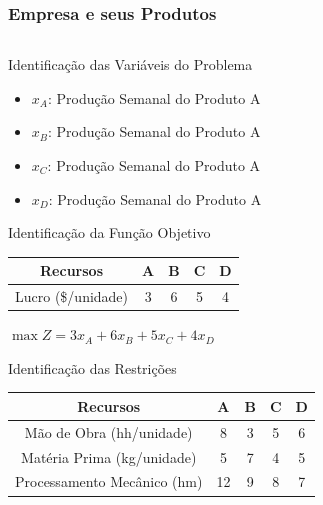 \documentclass{beamer}
\begin{document}
\begin{frame}
	\frametitle{Empresa e seus Produtos}
	\begin{columns}
		\begin{column}{0.7\textwidth}
			\only<1-2>
			{
				\begin{block}{Identificação das Variáveis do Problema}
					\centering
					\only<2>
					{
						\begin{itemize}
							\item[] $x_A$: Produção Semanal do Produto A 
							\item[] $x_B$: Produção Semanal do Produto A
							\item[] $x_C$: Produção Semanal do Produto A
							\item[] $x_D$: Produção Semanal do Produto A
						\end{itemize}
					}
				\end{block}
			}
			{
				\begin{block}{Identificação da Função Objetivo}
					\centering
					\only<4-5>
					{
						\begin{table}
							\begin{tabular}{| c | c | c | c | c |}
								\hline
								\textbf{Recursos}  & \textbf{A} & \textbf{B} & \textbf{C} & \textbf{D} \\
								\hline
								Lucro (\$/unidade) & 3 & 6 & 5 & 4 \\
								\hline  
							\end{tabular}
						\end{table}
					}
					{
						$\max Z = 3x_A + 6x_B + 5x_C + 4x_D$
					}
				\end{block}
			}
			{
				\begin{block}{Identificação das Restrições}
					\centering
					\only<7-8>
					{
						\begin{table}
							\scriptsize
							\begin{tabular}{| c | c | c | c | c |}
								\hline
								\textbf{Recursos}  			& \textbf{A} & \textbf{B} & \textbf{C} & \textbf{D} \\
								\hline
								Mão de Obra (hh/unidade)	& 8		     & 3		  & 5		   &6		    \\
								Matéria Prima (kg/unidade)	& 5			 & 7 		  & 4		   &5			\\
								Processamento Mecânico (hm) & 12		 & 9		  & 8  		   &7			\\
								\hline  
							\end{tabular}

\end{table}}
\end{block}}
\end{column}
\end{columns}
\end{frame}
\end{document}
